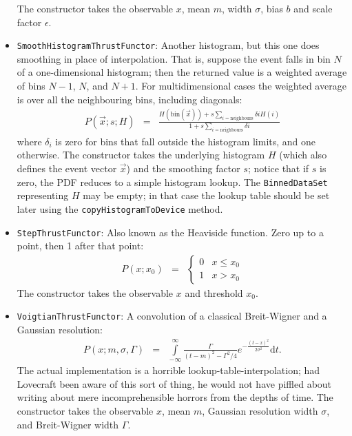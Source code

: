 \documentclass[12pt,pdflatex]{article}
\begin{document}
\begin{itemize}
The constructor takes the observable $x$, mean $m$, width $\sigma$, bias $b$ and
scale factor $\epsilon$. 
\item \texttt{SmoothHistogramThrustFunctor}: Another histogram, but this one does
smoothing in place of interpolation. That is, suppose the event falls in bin $N$ of
a one-dimensional histogram; then the returned value is a weighted average of bins
$N-1$, $N$, and $N+1$. For multidimensional cases the weighted average is over all
the neighbouring bins, including diagonals:
\begin{eqnarray}
P(\vec x;s;H) &=& \frac{H(\mathrm{bin}(\vec x)) + s\sum\limits_{i=\mathrm{neighbours}}\delta{i}H(i)}{1 + s\sum\limits_{i=\mathrm{neighbours}}\delta{i}}
\end{eqnarray}
where $\delta_i$ is zero for bins that fall outside the histogram limits,
and one otherwise. The constructor takes the underlying histogram $H$ (which also
defines the event vector $\vec x$) and the smoothing
factor $s$; notice that if $s$ is zero, the PDF reduces to a simple histogram lookup. 
The \texttt{BinnedDataSet} representing $H$ may be empty; in that case the lookup table should
be set later using the \texttt{copyHistogramToDevice} method. 
\item \texttt{StepThrustFunctor}: Also known as the Heaviside function. Zero up to a point, 
then 1 after that point:
\begin{eqnarray}
P(x;x_0) &=& \left\{
\begin{matrix}
0 & x \le x_0 \\ 
1 & x > x_0 
\end{matrix}
\right.
\end{eqnarray}
The constructor takes the observable $x$ and threshold $x_0$. 
\item \texttt{VoigtianThrustFunctor}: A convolution of a classical Breit-Wigner
and a Gaussian resolution:
\begin{eqnarray}
P(x;m,\sigma,\Gamma) &=& \int\limits_{-\infty}^\infty\frac{\Gamma}{(t-m)^2-\Gamma^2/4} e^{-\frac{(t-x)^2}{2\sigma^2}}\mathrm{d}t. 
\end{eqnarray}
The actual implementation is a horrible lookup-table-interpolation;
had Lovecraft been aware of this sort of thing, he would not have piffled
about writing about mere incomprehensible horrors from the depths of time.
The constructor takes the observable $x$, mean $m$, Gaussian resolution width
$\sigma$, and Breit-Wigner width $\Gamma$. 
\end{itemize}
\end{document}
